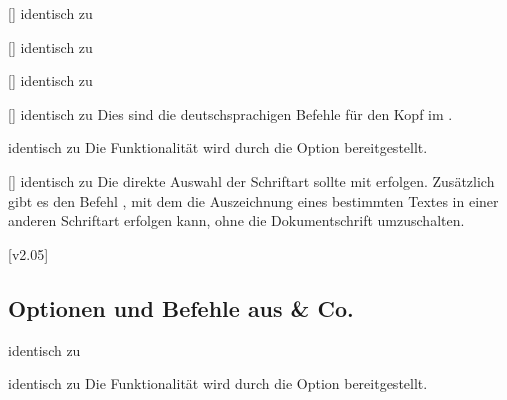 \begin{Bundle*}{}
\begin{Declaration}{[]}{%
  identisch zu %
}
\begin{Declaration}{[]}{%
  identisch zu %
}
\begin{Declaration}{[]}{%
  identisch zu %
}
\begin{Declaration}{[]}{%
  identisch zu %
}
\printdeclarationlist%
%
Dies sind die deutschsprachigen Befehle für den Kopf im \CD.
\end{Declaration}
\end{Declaration}
\end{Declaration}
\end{Declaration}

\begin{Declaration}{}{%
  identisch zu %
}
\printdeclarationlist%
%
Die Funktionalität wird durch die Option  bereitgestellt.
\end{Declaration}

\begin{Declaration}{[]}{%
  identisch zu %
}
\printdeclarationlist%
%
Die direkte Auswahl der Schriftart sollte mit  erfolgen. 
Zusätzlich gibt es den Befehl , mit dem die Auszeichnung 
eines bestimmten Textes in einer anderen Schriftart erfolgen kann, ohne die 
Dokumentschrift umzuschalten.
\end{Declaration}
[v2.05]
%


\subsection{Optionen und Befehle aus  \& Co.}
\begin{Declaration}{}{%
  identisch zu %
}
\begin{Declaration}{}{%
  identisch zu %
}
\printdeclarationlist%
%
Die Funktionalität wird durch die Option  bereitgestellt.
\end{Declaration}
\end{Declaration}


\end{Bundle*}
